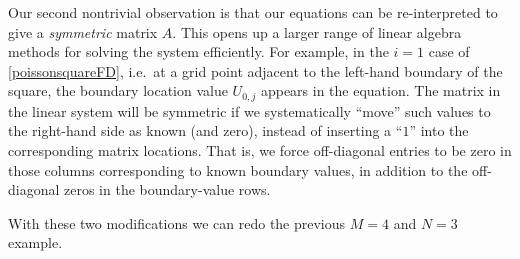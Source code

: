 Our second nontrivial observation is that our equations can be re-interpreted to give a \emph{symmetric} matrix $A$.  This opens up a larger range of linear algebra methods for solving the system efficiently.  For example, in the $i=1$ case of \eqref{poissonsquareFD}, i.e.~at a grid point adjacent to the left-hand boundary of the square, the boundary location value $U_{0,j}$ appears in the equation.  The matrix in the linear system will be symmetric if we systematically ``move'' such values to the right-hand side as known (and zero), instead of inserting a ``$1$'' into the corresponding matrix locations.  That is, we force off-diagonal entries to be zero in those columns corresponding to known boundary values, in addition to the off-diagonal zeros in the boundary-value rows.

With these two modifications we can redo the previous $M=4$ and $N=3$ example.

